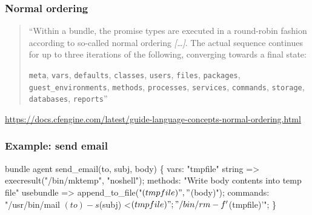 \documentclass[english,serif,mathserif,usenames,dvipsnames]{beamer}
\begin{document}
\begin{frame}[fragile]
  \frametitle{Normal ordering}

  \begin{quote}
    ``\alert<1>{Within a bundle, the promise types are executed in a
      round-robin fashion according to so-called normal ordering}
    \emph{[\ldots]}. \alert<2>{The actual sequence continues for up to
      three iterations of the following}, converging towards a final
    state:

    \texttt{meta},
    \texttt{vars},
    \texttt{defaults},
    \texttt{classes},
    \texttt{users},
    \texttt{files},
    \texttt{packages},
    \texttt{guest\_environments},
    \texttt{methods},
    \texttt{processes},
    \texttt{services},
    \texttt{commands},
    \texttt{storage},
    \texttt{databases},
    \texttt{reports}''
  \end{quote}


  \begin{references}
    \url{https://docs.cfengine.com/latest/guide-language-concepts-normal-ordering.html}
  \end{references}
\end{frame}


\begin{frame}[fragile]
  \frametitle{Example: send email}
\begin{semiverbatim}\small
bundle agent send_email(to, subj, body) \{
  vars:
      "tmpfile"
      \alert<2>{string => execresult("/bin/mktemp", "noshell");}
  methods:
      "Write body contents into temp file"
      usebundle  => append_to_file("$(tmpfile)",
                                   "$(body)");
  commands:
      "/usr/bin/mail $(to) -s $(subj) <$(tmpfile)";
      "/bin/rm -f '$(tmpfile)'";
\}
\end{semiverbatim}

\end{frame}
\end{document}
